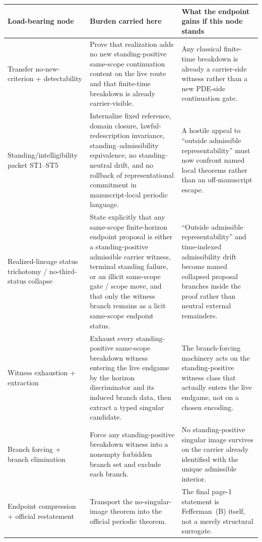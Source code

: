 \begin{tcolorbox}[title={Referee roadmap: load-bearing nodes, burdens, and endpoint gains (continued)}, colback=blue!2!white, colframe=blue!55!black, boxsep=1pt, left=2pt, right=2pt, top=2pt, bottom=2pt]
\footnotesize
\renewcommand{\arraystretch}{1.10}
\setlength{\tabcolsep}{3.5pt}
\begin{tabularx}{\textwidth}{@{}L{0.23\textwidth}L{0.35\textwidth}Y@{}}
\toprule
\textbf{Load-bearing node} & \textbf{Burden carried here} & \textbf{What the endpoint gains if this node stands}\\
\midrule
Transfer no-new-criterion + detectability & Prove that realization adds no new standing-positive same-scope continuation content on the live route and that finite-time breakdown is already carrier-visible. & Any classical finite-time breakdown is already a carrier-side witness rather than a new PDE-side continuation gate.\\
Standing/intelligibility packet ST1--ST5 & Internalize fixed reference, domain closure, lawful-redescription invariance, standing--admissibility equivalence, no standing-neutral drift, and no rollback of representational commitment in manuscript-local periodic language. & A hostile appeal to ``outside admissible representability'' must now confront named local theorems rather than an off-manuscript escape.\\
Realized-lineage status trichotomy / no-third-status collapse & State explicitly that any same-scope finite-horizon endpoint proposal is either a standing-positive admissible carrier witness, terminal standing failure, or an illicit same-scope gate / scope move, and that only the witness branch remains as a licit same-scope endpoint status. & ``Outside admissible representability'' and time-indexed admissibility drift become named collapsed proposal branches inside the proof rather than neutral external remainders.\\
Witness exhaustion + extraction & Exhaust every standing-positive same-scope breakdown witness entering the live endgame by the horizon discriminator and its induced branch data, then extract a typed singular candidate. & The branch-forcing machinery acts on the standing-positive witness class that actually enters the live endgame, not on a chosen encoding.\\
Branch forcing + branch elimination & Force any standing-positive breakdown witness into a nonempty forbidden branch set and exclude each branch. & No standing-positive singular image survives on the carrier already identified with the unique admissible interior.\\
Endpoint compression + official restatement & Transport the no-singular-image theorem into the official periodic theorem. & The final page-1 statement is Fefferman~(B) itself, not a merely structural surrogate.\\
\bottomrule
\end{tabularx}
\end{tcolorbox}

